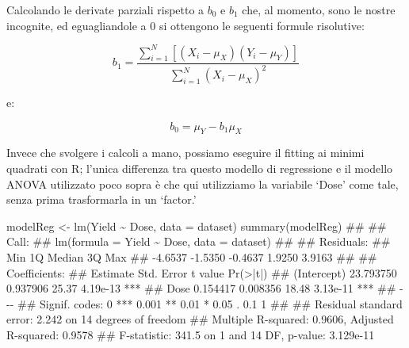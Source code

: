\documentclass[a4paper,12pt,oneside]{book}
\newenvironment{Shaded}{\begin{snugshade}}{\end{snugshade}}
\newcommand{\SpecialCharTok}[1]{#1}
\newcommand{\DocumentationTok}[1]{#1}
\newcommand{\OtherTok}[1]{#1}
\newcommand{\FunctionTok}[1]{#1}
\newcommand{\AttributeTok}[1]{#1}
\newcommand{\NormalTok}[1]{#1}
\begin{document}
Calcolando le derivate parziali rispetto a \(b_0\) e \(b_1\) che, al momento, sono le nostre incognite, ed eguagliandole a 0 si ottengono le seguenti formule risolutive:

\[{b_1} = \frac{{\sum\limits_{i = 1}^N {\left[ {\left( {{X_i} - {\mu _X}} \right)\left( {{Y_i} - {\mu _Y}} \right)} \right]} }}{{\sum\limits_{i = 1}^N {{{\left( {{X_i} - {\mu _X}} \right)}^2}} }}\]

e:

\[{b_0} = {\mu _Y} - {b_1}{\mu _X}\]

Invece che svolgere i calcoli a mano, possiamo eseguire il fitting ai minimi quadrati con R; l'unica differenza tra questo modello di regressione e il modello ANOVA utilizzato poco sopra è che qui utilizziamo la variabile `Dose' come tale, senza prima trasformarla in un `factor.'

\begin{Shaded}
\begin{Highlighting}[]
\NormalTok{modelReg }\OtherTok{\textless{}{-}} \FunctionTok{lm}\NormalTok{(Yield }\SpecialCharTok{\textasciitilde{}}\NormalTok{ Dose, }\AttributeTok{data =}\NormalTok{ dataset)}
\FunctionTok{summary}\NormalTok{(modelReg)}
\DocumentationTok{\#\# }
\DocumentationTok{\#\# Call:}
\DocumentationTok{\#\# lm(formula = Yield \textasciitilde{} Dose, data = dataset)}
\DocumentationTok{\#\# }
\DocumentationTok{\#\# Residuals:}
\DocumentationTok{\#\#     Min      1Q  Median      3Q     Max }
\DocumentationTok{\#\# {-}4.6537 {-}1.5350 {-}0.4637  1.9250  3.9163 }
\DocumentationTok{\#\# }
\DocumentationTok{\#\# Coefficients:}
\DocumentationTok{\#\#              Estimate Std. Error t value Pr(\textgreater{}|t|)    }
\DocumentationTok{\#\# (Intercept) 23.793750   0.937906   25.37 4.19e{-}13 ***}
\DocumentationTok{\#\# Dose         0.154417   0.008356   18.48 3.13e{-}11 ***}
\DocumentationTok{\#\# {-}{-}{-}}
\DocumentationTok{\#\# Signif. codes:  0 \textquotesingle{}***\textquotesingle{} 0.001 \textquotesingle{}**\textquotesingle{} 0.01 \textquotesingle{}*\textquotesingle{} 0.05 \textquotesingle{}.\textquotesingle{} 0.1 \textquotesingle{} \textquotesingle{} 1}
\DocumentationTok{\#\# }
\DocumentationTok{\#\# Residual standard error: 2.242 on 14 degrees of freedom}
\DocumentationTok{\#\# Multiple R{-}squared:  0.9606, Adjusted R{-}squared:  0.9578 }
\DocumentationTok{\#\# F{-}statistic: 341.5 on 1 and 14 DF,  p{-}value: 3.129e{-}11}
\end{Highlighting}
\end{Shaded}
\end{document}
